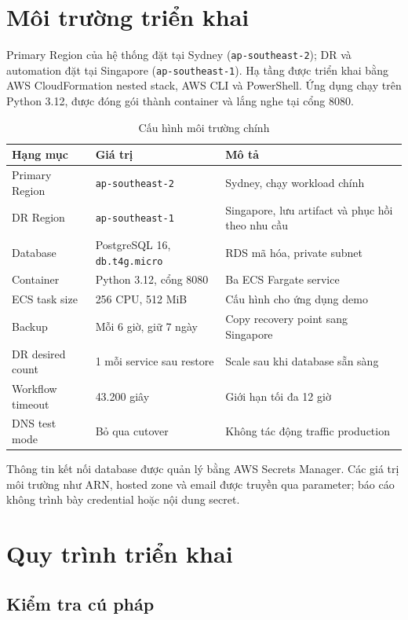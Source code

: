 \section{Môi trường triển khai}

Primary Region của hệ thống đặt tại Sydney (\texttt{ap-southeast-2}); DR và automation đặt tại Singapore (\texttt{ap-southeast-1}). Hạ tầng được triển khai bằng AWS CloudFormation nested stack, AWS CLI và PowerShell. Ứng dụng chạy trên Python 3.12, được đóng gói thành container và lắng nghe tại cổng 8080.

\begin{table}[H]
\centering
\caption{Cấu hình môi trường chính}
\label{tab:environment}
\begin{tabularx}{\textwidth}{@{}l l X@{}}
\toprule
\textbf{Hạng mục} & \textbf{Giá trị} & \textbf{Mô tả} \\
\midrule
Primary Region & \texttt{ap-southeast-2} & Sydney, chạy workload chính \\
DR Region & \texttt{ap-southeast-1} & Singapore, lưu artifact và phục hồi theo nhu cầu \\
Database & PostgreSQL 16, \texttt{db.t4g.micro} & RDS mã hóa, private subnet \\
Container & Python 3.12, cổng 8080 & Ba ECS Fargate service \\
ECS task size & 256 CPU, 512 MiB & Cấu hình cho ứng dụng demo \\
Backup & Mỗi 6 giờ, giữ 7 ngày & Copy recovery point sang Singapore \\
DR desired count & 1 mỗi service sau restore & Scale sau khi database sẵn sàng \\
Workflow timeout & 43.200 giây & Giới hạn tối đa 12 giờ \\
DNS test mode & Bỏ qua cutover & Không tác động traffic production \\
\bottomrule
\end{tabularx}
\end{table}

Thông tin kết nối database được quản lý bằng AWS Secrets Manager. Các giá trị môi trường như ARN, hosted zone và email được truyền qua parameter; báo cáo không trình bày credential hoặc nội dung secret.

\section{Quy trình triển khai}

\subsection{Kiểm tra cú pháp}

